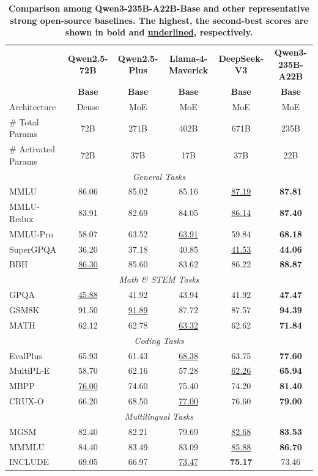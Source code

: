 \begin{table}[tbp]
\centering
\caption{\textbf{Comparison among Qwen3-235B-A22B-Base and other representative strong open-source baselines. The highest,
the second-best scores are shown in \textbf{bold} and \underline{underlined}, respectively.}}
\label{tab:base-235A22B}
\small %
\setlength{\tabcolsep}{3pt} %
\begin{tabular}{@{}lccccc@{}}
\toprule
& \textbf{Qwen2.5-72B} & \textbf{Qwen2.5-Plus} & \textbf{Llama-4-Maverick} & \textbf{DeepSeek-V3} & \textbf{Qwen3-235B-A22B} \\
& \textbf{Base} & \textbf{Base} & \textbf{Base} & \textbf{Base} & \textbf{Base} \\
\midrule
Architecture & Dense & MoE & MoE & MoE & MoE\\
\# Total Params & 72B & 271B & 402B & 671B & 235B\\
\# Activated Params & 72B & 37B & 17B & 37B & 22B\\
\midrule
\multicolumn{6}{c}{\textit{General Tasks}} \\
\midrule
MMLU & 86.06 & 85.02 & 85.16 & \underline{87.19} & \textbf{87.81}\\
MMLU-Redux & 83.91 & 82.69 & 84.05 & \underline{86.14} & \textbf{87.40} \\
MMLU-Pro & 58.07 & 63.52 & \underline{63.91} & 59.84 & \textbf{68.18} \\
SuperGPQA & 36.20 & 37.18 & 40.85 & \underline{41.53} & \textbf{44.06} \\
BBH & \underline{86.30} & 85.60 & 83.62 & 86.22 & \textbf{88.87} \\
\midrule
\multicolumn{6}{c}{\textit{Math \& STEM Tasks}} \\
\midrule
GPQA & \underline{45.88} & 41.92 & 43.94 & 41.92 & \textbf{47.47} \\
GSM8K & 91.50 & \underline{91.89} & 87.72 & 87.57 & \textbf{94.39} \\
MATH & 62.12 & 62.78 & \underline{63.32} & 62.62 & \textbf{71.84} \\
\midrule
\multicolumn{6}{c}{\textit{Coding Tasks}} \\
\midrule
EvalPlus & 65.93 & 61.43 & \underline{68.38} & 63.75 & \textbf{77.60} \\
MultiPL-E & 58.70 & 62.16 & 57.28 & \underline{62.26} & \textbf{65.94} \\
MBPP & \underline{76.00} & 74.60 & 75.40 & 74.20 & \textbf{81.40} \\
CRUX-O & 66.20 & 68.50 & \underline{77.00} & 76.60 & \textbf{79.00} \\
\midrule
\multicolumn{6}{c}{\textit{Multilingual Tasks}} \\
\midrule
MGSM & 82.40 & 82.21 & 79.69 & \underline{82.68} & \textbf{83.53} \\
MMMLU & 84.40 & 83.49 & 83.09 & \underline{85.88} & \textbf{86.70} \\
INCLUDE & 69.05 & 66.97 & \underline{73.47} & \textbf{75.17} & 73.46 \\
\bottomrule
\end{tabular}
\end{table}




